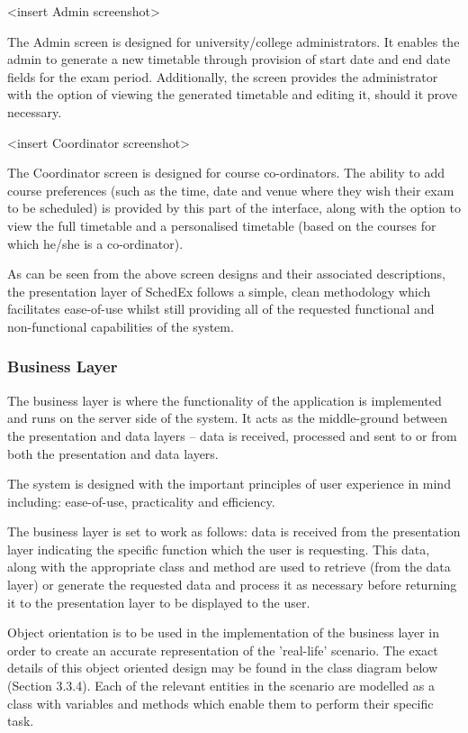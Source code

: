 \documentclass{article}
\begin{document}
<insert Admin screenshot> 

The Admin screen is designed for university/college administrators. It enables the admin to generate a new timetable through provision of start date and end date fields for the exam period. Additionally, the screen provides the administrator with the option of viewing the generated timetable and editing it, should it prove necessary. 

<insert Coordinator screenshot> 

The Coordinator screen is designed for course co-ordinators. The ability to add course preferences (such as the time, date and venue where they wish their exam to be scheduled) is provided by this part of the interface, along with the option to view the full timetable and a personalised timetable (based on the courses for which he/she is a co-ordinator).

As can be seen from the above screen designs and their associated descriptions, the presentation layer of SchedEx follows a simple, clean methodology which facilitates ease-of-use whilst still providing all of the requested functional and non-functional capabilities of the system.

\subsubsection{Business Layer}
The business layer is where the functionality of the application is implemented and runs on the server side of the system. It acts as the middle-ground between the presentation and data layers – data is received, processed and sent to or from both the presentation and data layers.

The system is designed with the important principles of user experience in mind including: ease-of-use, practicality and efficiency.

The business layer is set to work as follows: data is received from the presentation layer indicating the specific function which the user is requesting. This data, along with the appropriate class and method are used to retrieve (from the data layer) or generate the requested data and process it as necessary before returning it to the presentation layer to be displayed to the user.

Object orientation is to be used in the implementation of the business layer in order to create an accurate representation of the 'real-life' scenario. The exact details of this object oriented design may be found in the class diagram below (Section 3.3.4). Each of the relevant entities in the scenario are modelled as a class with variables and methods which enable them to perform their specific task.
\end{document}

